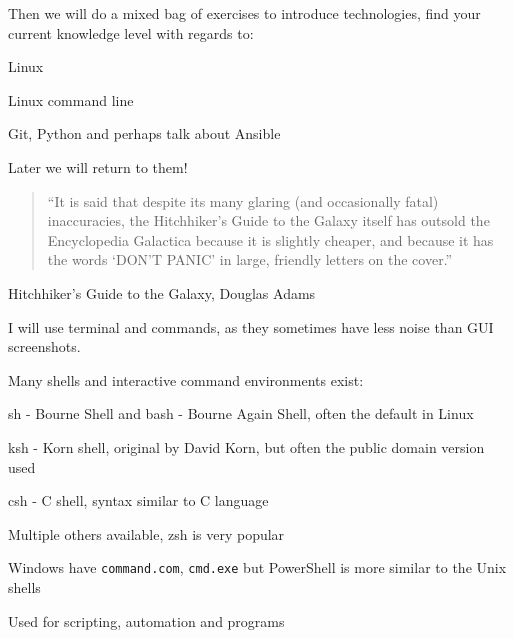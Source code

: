 \documentclass[Screen16to9,17pt]{foils}
\begin{document}
Then we will do a mixed bag of exercises to introduce technologies, find your current knowledge level with regards to:

\begin{list2}
\item Linux
\item Linux command line
\item Git, Python and perhaps talk about Ansible
\end{list2}


Later we will return to them!




\begin{quote}
“It is said that despite its many glaring (and occasionally fatal) inaccuracies, the Hitchhiker’s Guide to the Galaxy itself has outsold the Encyclopedia Galactica because it is slightly cheaper, and because it has the words ‘DON’T PANIC’ in large, friendly letters on the cover.”
\end{quote}
Hitchhiker’s Guide to the Galaxy, Douglas Adams






I will use terminal and commands, as they sometimes have less noise than GUI screenshots.

\begin{list1}
\item Many shells and interactive command environments exist:
\begin{list2}
\item sh - Bourne Shell and bash - Bourne Again Shell, often the default in Linux
\item ksh - Korn shell, original by David Korn, but often the public domain version used
\item csh - C shell, syntax similar to C language
\item Multiple others available, zsh is very popular
  \end{list2}
\item Windows have \verb+command.com+, \verb+cmd.exe+ but PowerShell is more similar to the Unix shells
\item Used for scripting, automation and programs
\end{list1}
\end{document}
